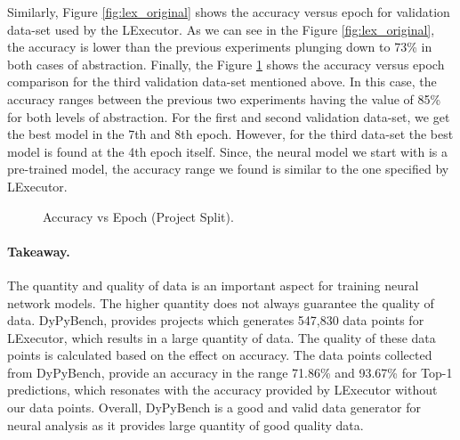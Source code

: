 Similarly, Figure \ref{fig:lex_original} shows the accuracy versus epoch for validation data-set used by the LExecutor.
As we can see in the Figure \ref{fig:lex_original}, the accuracy is lower than the previous experiments plunging down to 73\% in both cases of abstraction.
Finally, the Figure \ref{fig:lex_project} shows the accuracy versus epoch comparison for the third validation data-set mentioned above.
In this case, the accuracy ranges between the previous two experiments having the value of 85\% for both levels of abstraction.
For the first and second validation data-set, we get the best model in the 7th and 8th epoch.
However, for the third data-set the best model is found at the 4th epoch itself.
Since, the neural model we start with is a pre-trained model, the accuracy range we found is similar to the one specified by LExecutor.
\begin{figure}[ht]
    \centering
    \caption[Accuracy vs Epoch (Project Split)]{\label{fig:lex_project}Accuracy vs Epoch (Project Split). }
\end{figure}

\paragraph{Takeaway.} The quantity and quality of data is an important aspect for training neural network models. The higher quantity does not always guarantee the quality of data.
DyPyBench, provides projects which generates 547,830 data points for LExecutor, which results in a large quantity of data.
The quality of these data points is calculated based on the effect on accuracy.
The data points collected from DyPyBench, provide an accuracy in the range 71.86\% and 93.67\% for Top-1 predictions, which resonates with the accuracy provided by LExecutor without our data points.
Overall, DyPyBench is a good and valid data generator for neural analysis as it provides large quantity of good quality data.   

